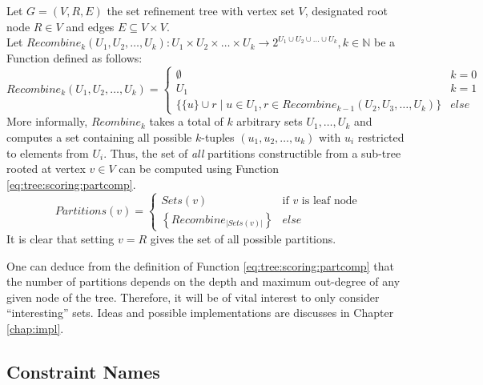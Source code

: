 		Let $G = (V, R, E)$ the set refinement tree with vertex set $V$, designated root node $R \in V$ and edges $E \subseteq V \times V$. \\
		Let $Recombine_k(U_1, U_2, \ldots, U_k): U_1 \times U_2 \times \ldots \times U_k \xrightarrow{} 2^{U_1 \cup U_2 \cup \ldots \cup U_k}, k \in \mathbb{N}$ be a Function defined as follows:
		\begin{equation*}
			Recombine_k(U_1, U_2, \ldots, U_k) = \begin{cases}
				\emptyset & k = 0 \\
				U_1 & k = 1 \\
				\{ \{ u \} \cup r \mid u \in U_1, r \in Recombine_{k-1}(U_2, U_3, \ldots, U_k) \} & else
			\end{cases}
		\end{equation*}
		More informally, $Reombine_k$ takes a total of $k$ arbitrary sets $U_1, \ldots, U_k$ and computes a set containing all possible $k$-tuples $(u_1, u_2, \ldots, u_k)$ with $u_i$ restricted to elements from $U_i$.
		Thus, the set of \textit{all} partitions constructible from a sub-tree rooted at vertex $v \in V$ can be computed using Function \ref{eq:tree:scoring:partcomp}.
		\begin{equation}
		\label{eq:tree:scoring:partcomp}
			Partitions(v) = \begin{cases}
				Sets(v) & \text{if $v$ is leaf node} \\
				\left\{ Recombine_{|Sets(v)|} \right\} & else
			\end{cases}
		\end{equation}
		It is clear that setting $v = R$ gives the set of all possible partitions.
		
		One can deduce from the definition of Function \ref{eq:tree:scoring:partcomp} that the number of partitions depends on the depth and maximum out-degree of any given node of the tree.
		Therefore, it will be of vital interest to only consider \enquote{interesting} sets.
		Ideas and possible implementations are discusses in Chapter \ref{chap:impl}.
		
		\clearpage
	
		\subsection{Constraint Names}
		\label{chap:tree:scoring:names}
		
